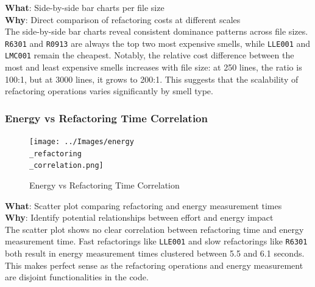 \documentclass[12pt, titlepage]{article}
\begin{document}
\noindent \textbf{What}: Side-by-side bar charts per file size\\

\noindent \textbf{Why}: Direct comparison of refactoring costs at
different scales\\

The side-by-side bar charts reveal consistent dominance patterns
across file sizes. \texttt{R6301} and \texttt{R0913} are always the
top two most expensive smells, while \texttt{LLE001} and
\texttt{LMC001} remain the cheapest. Notably, the relative cost
difference between the most and least expensive smells increases with
file size: at 250 lines, the ratio is 100:1, but at 3000 lines, it
grows to 200:1. This suggests that the scalability of refactoring
operations varies significantly by smell type.

\subsubsection{Energy vs Refactoring Time Correlation}

\begin{figure}[H]
  \centering
  \texttt{[image: ../Images/energy\\\_refactoring\\\_correlation.png]}
  \caption{Energy vs Refactoring Time Correlation}
\end{figure}

\noindent \textbf{What}: Scatter plot comparing refactoring and
energy measurement times\\

\noindent \textbf{Why}: Identify potential relationships between
effort and energy impact\\

The scatter plot shows no clear correlation between refactoring time
and energy measurement time. Fast refactorings like \texttt{LLE001}
and slow refactorings like \texttt{R6301} both result in energy
measurement times clustered between 5.5 and 6.1 seconds. This makes
perfect sense as the refactoring operations and energy measurement
are disjoint functionalities in the code.
\end{document}
